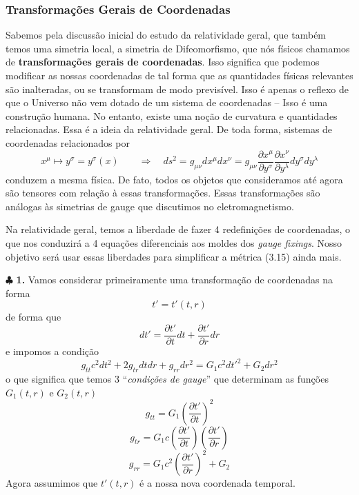 \documentclass[11pt]{article}
\begin{document}
    \hypertarget{transformauxe7uxf5es-gerais-de-coordenadas}{%
\subsubsection{Transformações Gerais de
Coordenadas}\label{transformauxe7uxf5es-gerais-de-coordenadas}}

    Sabemos pela discussão inicial do estudo da relatividade geral, que
também temos uma simetria local, a simetria de Difeomorfismo, que nós
físicos chamamos de \textbf{transformações gerais de coordenadas}. Isso
significa que podemos modificar as nossas coordenadas de tal forma que
as quantidades físicas relevantes são inalteradas, ou se transformam de
modo previsível. Isso é apenas o reflexo de que o Universo não vem
dotado de um sistema de coordenadas -- Isso é uma construção humana. No
entanto, existe uma noção de curvatura e quantidades relacionadas. Essa
é a ideia da relatividade geral. De toda forma, sistemas de coordenadas
relacionados por
\[ \tag{3.16} x^\mu \mapsto y^\sigma = y^\sigma(x) \qquad \Rightarrow \quad ds^2 = g_{\mu\nu} dx^\mu dx^\nu = g_{\mu\nu} \frac{\partial x^\mu}{\partial y^\sigma} \frac{\partial x^\nu}{\partial y^\lambda} dy^\sigma dy^\lambda \]
conduzem a mesma física. De fato, todos os objetos que consideramos até
agora são tensores com relação à essas transformações. Essas
transformações são análogas às simetrias de gauge que discutimos no
eletromagnetismo.

Na relatividade geral, temos a liberdade de fazer 4 redefinições de
coordenadas, o que nos conduzirá a 4 equações diferenciais aos moldes
dos \emph{gauge fixings}. Nosso objetivo será usar essas liberdades para
simplificar a métrica (3.15) ainda mais.

    \(\clubsuit\) \textbf{1.} Vamos considerar primeiramente uma
transformação de coordenadas na forma \[ \tag{3.16.a} t' = t'(t,r) \] de
forma que
\[ \tag{3.16.b} dt' = \frac{\partial t'}{\partial t} dt +  \frac{\partial t'}{\partial r} dr \]
e impomos a condição
\[ \tag{3.17} g_{tt} c^2 dt^2 + 2 g_{tr} dt dr + g_{rr} dr^2 = G_1 c^2 dt'^2 + G_2 dr^2 \]
o que significa que temos 3 ``\emph{condições de gauge}'' que determinam
as funções \(G_1(t,r)\) e \(G_2(t,r)\)
\[ \tag{3.18.a} g_{tt} = G_1 \left(\frac{\partial t'}{\partial t} \right)^2  \]
\[ \tag{3.18.a} g_{tr} = G_1 c \left(\frac{\partial t'}{\partial t} \right) \left(\frac{\partial t'}{\partial r} \right)  \]
\[ \tag{3.18.a} g_{rr} = G_1 c^2 \left(\frac{\partial t'}{\partial r} \right)^2 + G_2  \]
Agora assumimos que \(t'(t,r)\) é a nossa nova coordenada temporal.
\end{document}
